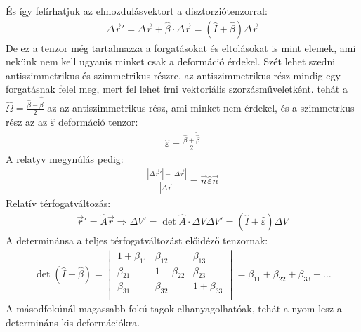 \documentclass{article}
\begin{document}
És így felírhatjuk az elmozdulásvektort a disztorziótenzorral:
\begin{align*}
\Delta \vec{r}' = \Delta \vec{r} + \hat{\beta} \cdot \Delta\vec{r} = (\hat{I} + \hat{\beta})\Delta \vec{r}
\end{align*}
De ez a tenzor még tartalmazza a forgatásokat és eltolásokat is mint elemek, ami nekünk nem kell ugyanis minket csak a deformáció érdekel. Szét lehet szedni antiszimmetrikus és szimmetrikus részre, az antiszimmetrikus rész mindig egy forgatásnak felel meg, mert fel lehet írni vektoriális szorzásműveletként. tehát a $\hat{\Omega} = \frac{\hat{\beta}-\hat{\tilde{\beta}}}{2}$ az az antiszimmetrikus  rész, ami minket nem érdekel, és a szimmetrkus rész az az $\hat{\varepsilon}$ deformáció tenzor:
\begin{align*}
\hat{\varepsilon} = \frac{\hat{\beta} + \tilde{\hat{\beta}}}{2}
\end{align*}
A relatyv megynúlás pedig:
\begin{align*}
\frac{|\Delta\vec{r}'|-|\Delta\vec{r}|}{|\Delta\vec{r}|} = \vec{n} \hat{\varepsilon} \vec{n}
\end{align*}
Relatív térfogatváltozás:
\begin{align*}
\vec{r}' = \hat{A} \vec{r} \Rightarrow \Delta V' = \det \hat{A} \cdot \Delta V
\Delta V' = (\hat{I} + \hat{\varepsilon})\Delta V
\end{align*}
A determinánsa a teljes térfogatváltozást előidéző tenzornak:
\begin{align*}
\det( \hat{I} + \hat{\beta}) = \begin{vmatrix}
1+\beta_{11} & \beta_{12} & \beta_{13} \\
\beta_{21} & 1+\beta_{22} & \beta_{23} \\
\beta_{31} & \beta_{32} & 1+\beta_{33} \\
\end{vmatrix} = \beta_{11} + \beta_{22} + \beta_{33} + \dots
\end{align*}
A másodfokúnál magassabb fokú tagok elhanyagolhatóak, tehát a nyom lesz a determináns kis deformációkra.
\newpage
\end{document}
